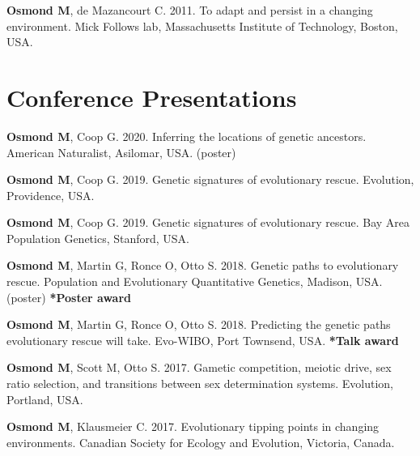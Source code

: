 \documentclass[12pt]{article}
\begin{document}

\textbf{Osmond M}, de Mazancourt C. 2011. To adapt and persist in a changing environment. Mick Follows lab, Massachusetts Institute of Technology, Boston, USA.

\section*{Conference Presentations}

\textbf{Osmond M}, Coop G. 2020. Inferring the locations of genetic ancestors. American Naturalist, Asilomar, USA. (poster)

\textbf{Osmond M}, Coop G. 2019. Genetic signatures of evolutionary rescue. Evolution, Providence, USA.

\textbf{Osmond M}, Coop G. 2019. Genetic signatures of evolutionary rescue. Bay Area Population Genetics, Stanford, USA.

\textbf{Osmond M}, Martin G, Ronce O, Otto S. 2018. Genetic paths to evolutionary rescue. Population and Evolutionary Quantitative Genetics, Madison, USA. (poster) \textbf{*Poster award}


\textbf{Osmond M}, Martin G, Ronce O, Otto S. 2018. Predicting the genetic paths evolutionary rescue will take. Evo-WIBO, Port Townsend, USA. \textbf{*Talk award}


\textbf{Osmond M}, Scott M, Otto S. 2017. Gametic competition, meiotic drive, sex ratio selection, and transitions between sex determination systems. Evolution, Portland, USA. 

\textbf{Osmond M}, Klausmeier C. 2017. Evolutionary tipping points in changing environments. Canadian Society for Ecology and Evolution, Victoria, Canada. 
\end{document}
